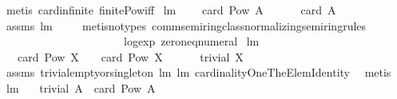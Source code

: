 \begin{isabellebody}
\ {\isacharparenleft}metis\ card{\isacharunderscore}infinite\ finite{\isacharunderscore}Pow{\isacharunderscore}iff{\isacharparenright}%
\endisatagproof
{\isafoldproof}%
%
\isadelimproof
\isanewline
%
\endisadelimproof
\isanewline
{}\isamarkupfalse%
\ lm{}{}{}{\isacharcolon}\ \isanewline
\ \ \ {\isachardoublequoteopen}card\ {\isacharparenleft}Pow\ A{\isacharparenright}\ {\isacharequal}\ {}{\isachardoublequoteclose}\ \isanewline
\ \ \ {\isachardoublequoteopen}card\ A\ {\isacharequal}\ {}{\isachardoublequoteclose}\ \isanewline
%
\isadelimproof
\ \ %
\endisadelimproof
%
\isatagproof
{}\isamarkupfalse%
\ assms\ lm{}{}{}\ \isanewline
\ \ \isamarkupfalse%
\ {\isacharparenleft}metis{\isacharparenleft}no{\isacharunderscore}types{\isacharparenright}\ comm{\isacharunderscore}semiring{\isacharunderscore}{}{\isacharunderscore}class{\isachardot}normalizing{\isacharunderscore}semiring{\isacharunderscore}rules{\isacharparenleft}{}{}{\isacharparenright}\ \isanewline
\ \ \ \ \ \ \ \ \ \ \ \ \ \ \ \ \ \ \ \ \ \ log{\isacharunderscore}exp\ zero{\isacharunderscore}neq{\isacharunderscore}numeral{\isacharparenright}%
\endisatagproof
{\isafoldproof}%
%
\isadelimproof
\isanewline
%
\endisadelimproof
\isanewline
{}\isamarkupfalse%
\ lm{}{}{}{\isacharcolon}\ \isanewline
\ \ \ {\isachardoublequoteopen}card\ {\isacharparenleft}Pow\ X{\isacharparenright}\ {\isacharequal}\ {}\ {\isasymor}\ card\ {\isacharparenleft}Pow\ X{\isacharparenright}\ {\isacharequal}\ {}{\isachardoublequoteclose}\ \isanewline
\ \ \ {\isachardoublequoteopen}trivial\ X{\isachardoublequoteclose}\ \isanewline
%
\isadelimproof
\ \ %
\endisadelimproof
%
\isatagproof
{}\isamarkupfalse%
\ assms\ trivial{\isacharunderscore}empty{\isacharunderscore}or{\isacharunderscore}singleton\ lm{}{}{}\ lm{}{}{}\ cardinalityOneTheElemIdentity\ \isamarkupfalse%
\ metis%
\endisatagproof
{\isafoldproof}%
%
\isadelimproof
\isanewline
%
\endisadelimproof
\isanewline
{}\isamarkupfalse%
\ lm{}{}{}{\isacharcolon}\ \isanewline
\ \ {\isachardoublequoteopen}trivial\ A\ {\isacharequal}\ {\isacharparenleft}card\ {\isacharparenleft}Pow\ A{\isacharparenright}\ {\isasymin}\ {\isacharbraceleft}{}{\isacharcomma}{}{\isacharbraceright}{\isacharparenright}{\isachardoublequoteclose}\ \isanewline

\end{isabellebody}
